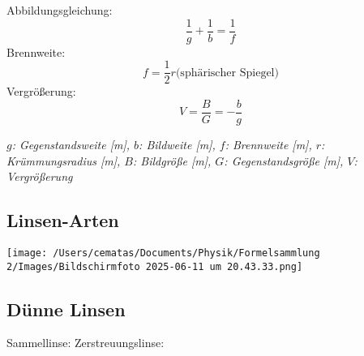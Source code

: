\documentclass[a4paper,10pt]{article}
\newenvironment{displayformula}
{
	\begin{framed}
		\color{formulaColor}
	}
	{\end{framed}}
\newcommand{\formulalegend}[1]{%
	\par\vspace{0.5ex}%
	{{\color{legendColor}\RaggedRight\small\textit{#1}}}%
	\par\vspace{1.5ex}%
}
\begin{document}
\begin{displayformula}
	Abbildungsgleichung:
	\[
	\frac{1}{g} + \frac{1}{b} = \frac{1}{f}
	\]
	Brennweite:
	\[
	f = \frac{1}{2} r \text{(sphärischer Spiegel)}
	\]
	Vergrößerung:
	\[
	V = \frac{B}{G} = -\frac{b}{g}
	\]
\end{displayformula}
\formulalegend{
	\( g \): Gegenstandsweite [m], \( b \): Bildweite [m], \( f \): Brennweite [m], \( r \): Krümmungsradius [m], \( B \): Bildgröße [m], \( G \): Gegenstandsgröße [m], \( V \): Vergrößerung
}

\subsection{Linsen-Arten}

\texttt{[image: /Users/cematas/Documents/Physik/Formelsammlung 2/Images/Bildschirmfoto 2025-06-11 um 20.43.33.png]}

\subsection{Dünne Linsen}

Sammellinse:
Zerstreuungslinse:
\end{document}
